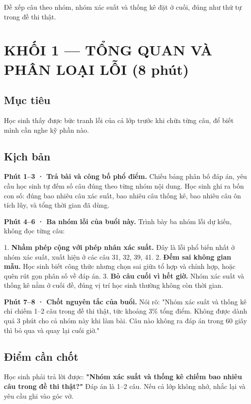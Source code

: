 \documentclass[11pt, a4paper]{article}
\begin{document}
Đề xếp câu theo nhóm, nhóm xác suất và thống kê đặt ở cuối, đúng như thứ tự trong đề thi thật.

\section{KHỐI 1 — TỔNG QUAN VÀ PHÂN LOẠI LỖI (8 phút)}

\subsection{Mục tiêu}

Học sinh thấy được bức tranh lỗi của cả lớp trước khi chữa từng câu, để biết mình cần nghe kỹ phần nào.

\subsection{Kịch bản}

\textbf{Phút 1–3 · Trả bài và công bố phổ điểm.} Chiếu bảng phân bố đáp án, yêu cầu học sinh tự đếm số câu đúng theo từng nhóm nội dung. Học sinh ghi ra bốn con số: đúng bao nhiêu câu xác suất, bao nhiêu câu thống kê, bao nhiêu câu ôn tích lũy, và tổng thời gian đã dùng.

\textbf{Phút 4–6 · Ba nhóm lỗi của buổi này.} Trình bày ba nhóm lỗi dự kiến, không đọc từng câu:

1. \textbf{Nhầm phép cộng với phép nhân xác suất.} Đây là lỗi phổ biến nhất ở nhóm xác suất, xuất hiện ở các câu 31, 32, 39, 41.
2. \textbf{Đếm sai không gian mẫu.} Học sinh biết công thức nhưng chọn sai giữa tổ hợp và chỉnh hợp, hoặc quên rút gọn phân số về đáp án.
3. \textbf{Bỏ câu cuối vì hết giờ.} Nhóm xác suất và thống kê nằm ở cuối đề, đúng vị trí học sinh thường không còn thời gian.

\textbf{Phút 7–8 · Chốt nguyên tắc của buổi.} Nói rõ: "Nhóm xác suất và thống kê chỉ chiếm 1–2 câu trong đề thi thật, tức khoảng 3\% tổng điểm. Không được dành quá 3 phút cho cả nhóm này khi làm bài. Câu nào không ra đáp án trong 60 giây thì bỏ qua và quay lại cuối giờ."

\subsection{Điểm cần chốt}

Học sinh phải trả lời được: \textbf{"Nhóm xác suất và thống kê chiếm bao nhiêu câu trong đề thi thật?"} Đáp án là 1–2 câu. Nếu cả lớp không nhớ, nhắc lại và yêu cầu ghi vào góc vở.
\end{document}

